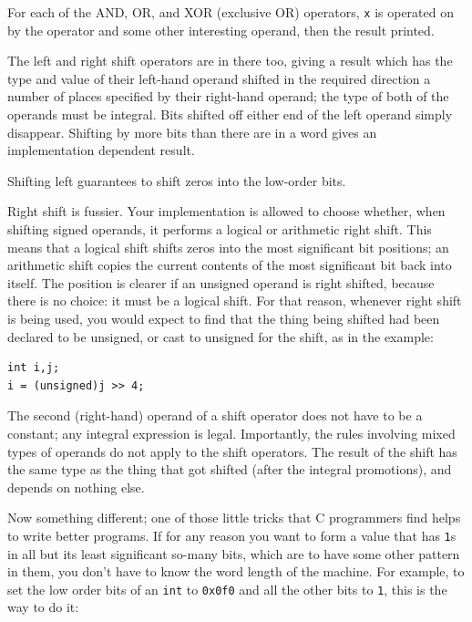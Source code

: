     For each of the AND, OR, and XOR (exclusive OR) operators,
     \texttt{x} is operated on by the operator and some other
     interesting operand, then the result printed.


    The left and right shift operators are in there too, giving a result
     which has the type and value of their left-hand operand shifted in the
     required direction a number of places specified by their right-hand
     operand; the type of both of the operands must be integral. Bits shifted
     off either end of the left operand simply disappear. Shifting by more
     bits than there are in a word gives an implementation dependent
     result.


    Shifting left guarantees to shift zeros into the low-order bits.


    Right shift is fussier. Your implementation is allowed to choose
     whether, when shifting signed operands, it performs a logical or
     arithmetic right shift. This means that a logical shift shifts zeros into
     the most significant bit positions; an arithmetic shift copies the
     current contents of the most significant bit back into itself. The
     position is clearer if an unsigned operand is right shifted, because
     there is no choice: it must be a logical shift. For that reason, whenever
     right shift is being used, you would expect to find that the thing being
     shifted had been declared to be unsigned, or cast to unsigned for the
     shift, as in the example:


    \begin{Verbatim}
int i,j;
i = (unsigned)j >> 4;
\end{Verbatim}

    The second (right-hand) operand of a shift operator does not have to be
     a constant; any integral expression is legal. Importantly, the rules
     involving mixed types of operands do not apply to the shift operators.
     The result of the shift has the same type as the thing that got shifted
     (after the integral promotions), and depends on nothing else.


    Now something different; one of those little tricks that
     C programmers find helps to write better programs. If for any reason
     you want to form a value that has \texttt{1}s in all but its
     least significant so-many bits, which are to have some other pattern in
     them, you don't have to know the word length of the machine. For example,
     to set the low order bits of an \texttt{int}
     to \texttt{0x0f0} and all the other bits to \texttt{1},
     this is the way to do it:


